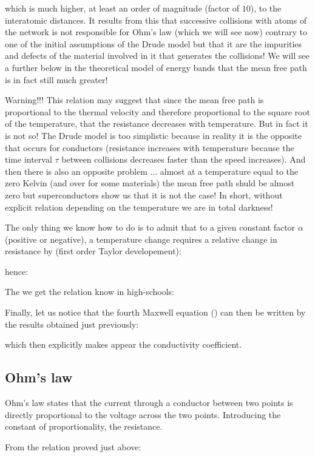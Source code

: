 	which is much higher, at least an order of magnitude (factor of $10$), to the interatomic distances. It results from this that successive collisions with atoms of the network is not responsible for Ohm's law (which we will see now) contrary to one of the initial assumptions of the Drude model but that it are the impurities and defects of the material involved in it that generates the collisions! We will see a further below in the theoretical model of energy bands that the mean free path is in fact still much greater!
	
	Warning!!! This relation may suggest that since the mean free path is proportional to the thermal velocity and therefore proportional to the square root of the temperature, that the resistance decreases with temperature. But in fact it is not so! The Drude model is too simplistic because in reality it is the opposite that occurs for conductors (resistance increases with temperature because the time interval $\tau$ between collisions decreases faster than the speed increases). And then there is also an opposite problem ... almost at a temperature equal to the zero Kelvin (and over for some materials) the mean free path shuld be almost zero but superconductors show us that it is not the case! In short, without explicit relation depending on the temperature we are in total darkness!
	
	The only thing we know how to do is to admit that to a given constant factor $\alpha$ (positive or negative), a temperature change requires a relative change in resistance by (first order Taylor developement):
	
	hence:
	
	The we get the relation know in high-schools:
	
	Finally, let us notice that the fourth Maxwell equation () can then be written by  the results obtained just previously:
	
	which then explicitly makes appear the conductivity coefficient.
	
	\pagebreak
	\subsection{Ohm's law}
	Ohm's law states that the current through a conductor between two points is directly proportional to the voltage across the two points. Introducing the constant of proportionality, the resistance.
	
	From the relation proved just above:
	
